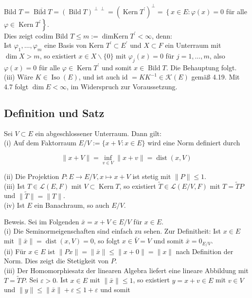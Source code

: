 \documentclass[10pt, letterpaper]{article}
\begin{document}
Bild $T=\overline{\operatorname{Bild} T}=(\operatorname{Bild} T)^{\perp \perp}=\left(\operatorname{Kern} T^{\prime}\right)^{\perp}=\left\{x \in E: \varphi(x)=0\right.$ für alle $\left.\varphi \in \operatorname{Kern} T^{\prime}\right\}$.\\
Dies zeigt codim Bild $T \leq m:=\operatorname{dimKern} T^{\prime}<\infty$, denn:\\
Ist $\varphi_{1}, \ldots, \varphi_{m}$ eine Basis von Kern $T^{\prime} \subset E^{\prime}$ und $X \subset F$ ein Unterraum mit $\operatorname{dim} X> m$, so existiert $x \in X \backslash\{0\}$ mit $\varphi_{j}(x)=0$ für $j=1, \ldots, m$, also $\varphi(x)=0$ für alle $\varphi \in \operatorname{Kern} T^{\prime}$ und somit $x \in \operatorname{Bild} T$. Die Behauptung folgt.\\
(iii) Wäre $K \in \operatorname{Iso}(E)$, und ist auch id $=K K^{-1} \in \mathcal{K}(E)$ gemäß 4.19. Mit 4.7 folgt $\operatorname{dim} E<\infty$, im Widerspruch zur Voraussetzung.

\subsection*{Definition und Satz}
Sei $V \subset E$ ein abgeschlossener Unterraum. Dann gilt:\\
(i) Auf dem Faktorraum $E / V:=\{x+V: x \in E\}$ wird eine Norm definiert durch

$$
\|x+V\|=\inf _{v \in V}\|x+v\|=\operatorname{dist}(x, V)
$$

(ii) Die Projektion $P: E \rightarrow E / V, x \mapsto x+V$ ist stetig mit $\|P\| \leq 1$.\\
(iii) Ist $T \in \mathcal{L}(E, F)$ mit $V \subset \operatorname{Kern} T$, so existiert $\tilde{T} \in \mathcal{L}(E / V, F)$ mit $T=\tilde{T} P$ und $\|\tilde{T}\|=\|T\|$.\\
(iv) Ist $E$ ein Banachraum, so auch $E / V$.

Beweis. Sei im Folgenden $\bar{x}=x+V \in E / V$ für $x \in E$.\\
(i) Die Seminormeigenschaften sind einfach zu sehen. Zur Definitheit: Ist $x \in E$ mit $\|\bar{x}\|=\operatorname{dist}(x, V)=0$, so folgt $x \in \bar{V}=V$ und somit $\bar{x}=0_{E / V}$.\\
(ii) Für $x \in E$ ist $\|P x\|=\|\bar{x}\| \leq\|x+0\|=\|x\|$ nach Definition der Norm. Dies zeigt die Stetigkeit von $P$.\\
(iii) Der Homomorphiesatz der linearen Algebra liefert eine lineare Abbildung mit $T=\tilde{T} P$. Sei $\varepsilon>0$. Ist $x \in E$ mit $\|\bar{x}\| \leq 1$, so existiert $y=x+v \in E$ mit $v \in V$ und $\|y\| \leq\|\bar{x}\|+\varepsilon \leq 1+\varepsilon$ und somit
\end{document}
